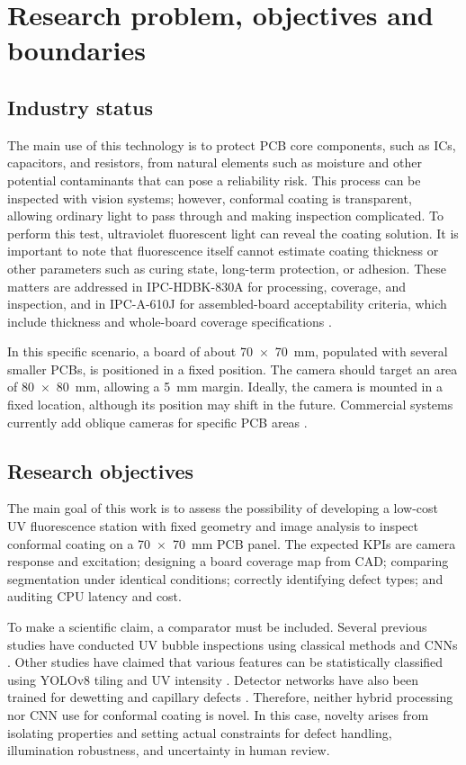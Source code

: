 \section{Research problem, objectives and boundaries}
\subsection{Industry status}
The main use of this technology is to protect PCB core components, such as ICs, capacitors, and resistors, from natural elements such as moisture and other potential contaminants that can pose a reliability risk. This process can be inspected with vision systems; however, conformal coating is transparent, allowing ordinary light to pass through and making inspection complicated. To perform this test, ultraviolet fluorescent light can reveal the coating solution. It is important to note that fluorescence itself cannot estimate coating thickness or other parameters such as curing state, long-term protection, or adhesion. These matters are addressed in IPC-HDBK-830A for processing, coverage, and inspection, and in IPC-A-610J for assembled-board acceptability criteria, which include thickness and whole-board coverage specifications \citep{ipchdbk830a,ipca610j,ipccc830c}.

In this specific scenario, a board of about 70~$\times$~70~mm, populated with several smaller PCBs, is positioned in a fixed position. The camera should target an area of 80~$\times$~80~mm, allowing a 5~mm margin. Ideally, the camera is mounted in a fixed location, although its position may shift in the future. Commercial systems currently add oblique cameras for specific PCB areas \citep{goepelcci,mirteccci}.

\subsection{Research objectives}
The main goal of this work is to assess the possibility of developing a low-cost UV fluorescence station with fixed geometry and image analysis to inspect conformal coating on a 70~$\times$~70~mm PCB panel. The expected KPIs are camera response and excitation; designing a board coverage map from CAD; comparing segmentation under identical conditions; correctly identifying defect types; and auditing CPU latency and cost.

To make a scientific claim, a comparator must be included. Several previous studies have conducted UV bubble inspections using classical methods and CNNs \citep{lee2021cnn,lee2021transfer}. Other studies have claimed that various features can be statistically classified using YOLOv8 tiling and UV intensity \citep{choi2024uv}. Detector networks have also been trained for dewetting and capillary defects \citep{patel2026coverage}. Therefore, neither hybrid processing nor CNN use for conformal coating is novel. In this case, novelty arises from isolating properties and setting actual constraints for defect handling, illumination robustness, and uncertainty in human review.
